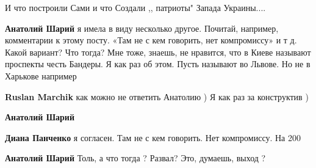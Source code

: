 \begin{itemize}
\begin{itemize}
И что построили Сами и что Создали ,, патриоты" Запада Украины....


 
\textbf{Анатолий Шарий} я имела в виду несколько другое. Почитай, например,
комментарии к этому посту. «Там не с кем говорить, нет компромиссу» и т д.
Какой вариант? Что тогда? Мне тоже, знаешь, не нравится, что в Киеве называют
проспекты честь Бандеры. Я как раз об этом. Пусть называют во Львове. Но не в
Харькове например


 
\textbf{Ruslan Marchik} как можно не ответить Анатолию )
Я как раз за конструктив )

 
\textbf{Анатолий Шарий} 👏👏👏👏

 

\textbf{Диана Панченко} я согласен. Там не с кем говорить. Нет компромиссу. На 200%


 
\textbf{Анатолий Шарий} Толь, а что тогда ? Развал? Это, думаешь, выход ?

 

\end{itemize}
\end{itemize}
